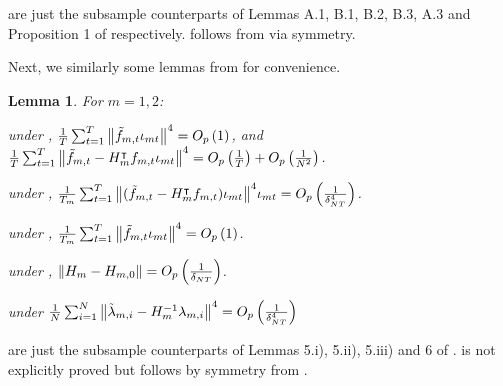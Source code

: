 \documentclass[12pt]{article}
\newtheorem{lemma}{Lemma}
\newcommand*{\tran}{\intercal}
\theoremstyle{plain}
\numberwithin{equation}{section}
\begin{document}
 are just the subsample counterparts of Lemmas A.1, B.1, B.2, B.3, A.3 and Proposition 1 of \textcite{bai_inferential_2003} respectively.  follows from  via symmetry.

Next, we similarly some lemmas from \textcite{han_tests_2015} for convenience.
\begin{lemma}
\label{lem:han_lem}
For $m = 1, 2$:
\begin{lemenum}
\item \label{lem:han_lem:1}
under , 
$\frac{1}{T} \sum_{t = 1}^{T} \norm{\tilde{f}_{m, t} \iota_{mt}}^4 = O_p \left( 1 \right)$, and $\fracT \sumT \norm{\tilde{f}_{m, t} - H^\tran_m f_{m, t}\iota_{mt} }^4 = \Op{\frac{1}{T}} + \Op{\frac{1}{N^2}}$.
\item \label{lem:han_lem:2}
under , $\frac{1}{T_m} \sumT \norm{
(\tilde{f}_{m, t} - H_m^\tran f_{m, t})
\iota_{mt} }^4 \iota_{mt} = \Opdeltaquart$.
\item \label{lem:han_lem:3}
under , 
$\frac{1}{T_m} \sum_{t = 1}^{T} \norm{\tilde{f}_{m, t}\iota_{mt} }^4 = O_p \left( 1 \right)$.
\item \label{lem:han_lem:4}
under ,
$\norm{H_m - H_{m, 0}} = O_p\left( \frac{1}{\delta_{NT}}\right)$.
\item \label{lem:han_lem:loadings}
under 
 $\frac{1}{N} \sum_{i = 1}^{N} \norm{\tilde{\lambda}_{m, i} - H_m^{-1} \lambda_{m, i}}^4 = O_p\left( \frac{1}{\delta_{NT}^4}\right)$
\end{lemenum}
\end{lemma}
 are just the subsample counterparts of Lemmas 5.i), 5.ii), 5.iii) and 6 of \textcite{han_tests_2015}.  is not explicitly proved but follows by symmetry from .  
\end{document}
